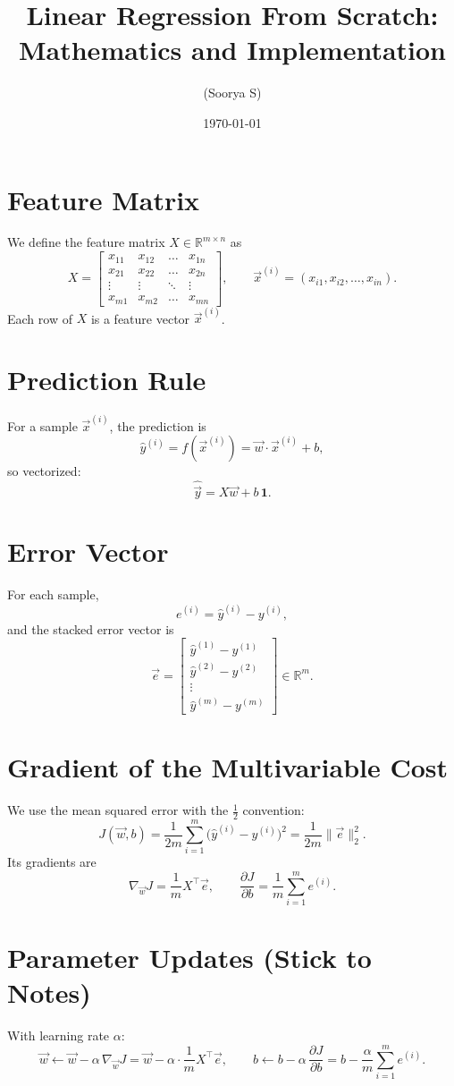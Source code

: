 \documentclass[12pt]{article}
\title{Linear Regression From Scratch: Mathematics and Implementation}
\author{(Soorya S)}
\date{\today}
\begin{document}
\maketitle

\section{Feature Matrix}
We define the feature matrix $X\in\mathbb{R}^{m\times n}$ as
\[
X=
\begin{bmatrix}
x_{11} & x_{12} & \dots & x_{1n}\\
x_{21} & x_{22} & \dots & x_{2n}\\
\vdots & \vdots & \ddots & \vdots\\
x_{m1} & x_{m2} & \dots & x_{mn}
\end{bmatrix},
\qquad
\vec x^{(i)}=(x_{i1},x_{i2},\dots,x_{in}).
\]
Each row of $X$ is a feature vector $\vec x^{(i)}$.

\section{Prediction Rule}
For a sample $\vec x^{(i)}$, the prediction is
\[
\hat y^{(i)}=f(\vec x^{(i)})=\vec w\cdot\vec x^{(i)}+b,
\]
so vectorized:
\[
\hat{\vec y}=X\vec w + b\,\mathbf 1.
\]

\section{Error Vector}
For each sample,
\[
e^{(i)}=\hat y^{(i)}-y^{(i)},
\]
and the stacked error vector is
\[
\vec e=
\begin{bmatrix}
\hat y^{(1)}-y^{(1)}\\
\hat y^{(2)}-y^{(2)}\\
\vdots\\
\hat y^{(m)}-y^{(m)}
\end{bmatrix}
\in\mathbb{R}^m.
\]

\section{Gradient of the Multivariable Cost}
We use the mean squared error with the $\tfrac12$ convention:
\[
J(\vec w,b)=\frac{1}{2m}\sum_{i=1}^m\!\big(\hat y^{(i)}-y^{(i)}\big)^2
=\frac{1}{2m}\|\vec e\|_2^2.
\]
Its gradients are
\[
\nabla_{\vec w}J=\frac{1}{m}X^\top\vec e,
\qquad
\frac{\partial J}{\partial b}=\frac{1}{m}\sum_{i=1}^m e^{(i)}.
\]

\section{Parameter Updates (Stick to Notes)}
With learning rate $\alpha$:
\[
\vec w \leftarrow \vec w - \alpha\,\nabla_{\vec w}J
=\vec w-\alpha\cdot\frac{1}{m}X^\top\vec e,
\qquad
b \leftarrow b - \alpha\,\frac{\partial J}{\partial b}
=b-\frac{\alpha}{m}\sum_{i=1}^m e^{(i)}.
\]
\end{document}

